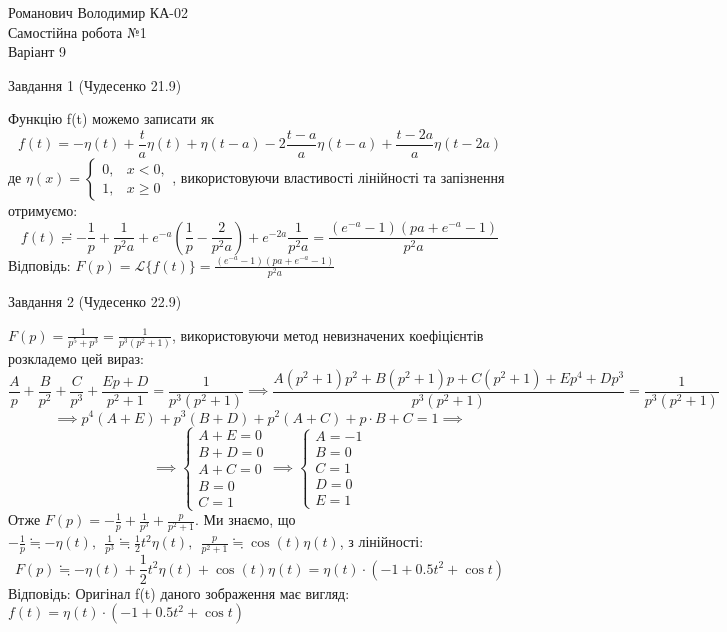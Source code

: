 \documentclass[12 pt]{article}
\begin{document}
\begin{center}
    \Large
    Романович Володимир КА-02 \\
    Самостійна робота №1 \\ 
    Варіант 9
\end{center}
\begin{center}
    \large 
    Завдання 1 (Чудесенко 21.9)
\end{center}
Функцію f(t) можемо записати як $$
f(t) = -\eta(t) + \frac{t}{a} \eta(t) +
\eta(t-a) - 2 \frac{t-a}{a} \eta(t-a) + \frac{t-2a}{a} \eta(t-2a)
$$
де $\eta(x) = 
\begin{cases}
    0, & x < 0,\\
    1, & x \geq 0
    \end{cases}$,
використовуючи властивості лінійності та запізнення отримуємо:\\ 
$$
f(t) \risingdotseq  -\frac{1}{p} + \frac{1}{p^2 a} +
 e^{-a}\left(\frac{1}{p} - \frac{2}{p^2 a}\right) + e^{-2a} \frac{1}{p^2 a} =
 \frac{(e^{-a} - 1)(pa+e^{-a}-1)}{p^2 a}
$$
Відповідь: $F(p) = \mathcal{L} \{ f(t) \} = \frac{(e^{-a} - 1)(pa+e^{-a}-1)}{p^2 a}$ 
\begin{center}
    \large 
    Завдання 2 (Чудесенко 22.9)
\end{center}
$F(p) = \frac{1}{p^5+p^3} = \frac{1}{p^3(p^2+1)}$, використовуючи метод
невизначених коефіцієнтів розкладемо цей вираз:
$$ 
\frac{A}{p} + \frac{B}{p^2} + \frac{C}{p^3} + \frac{Ep + D}{p^2+1} =
\frac{1}{p^3(p^2+1)}
\implies 
\frac{A(p^2+1)p^2 + B(p^2+1)p + C(p^2+1)+E p^4 + D p^3}{p^3(p^2+1)} 
= \frac{1}{p^3(p^2+1)}
$$ 
$$
\implies
p^4(A+E) + p^3(B+D) + p^2(A+C) + p\cdot B + C = 1
\implies
$$
$$ \implies
\begin{cases}
    A+E = 0 \\
    B+D = 0 \\ 
    A+C = 0 \\ 
    B = 0 \\ 
    C = 1
\end{cases}
\implies
\begin{cases}
    A = -1 \\ 
    B = 0 \\ 
    C = 1 \\
    D = 0 \\ 
    E = 1
\end{cases}
$$
Отже $F(p) = -\frac{1}{p} + \frac{1}{p^3} + \frac{p}{p^2 + 1}$. Ми знаємо, що
$-\frac{1}{p}\fallingdotseq - \eta(t), \ \ 
\frac{1}{p^3} \fallingdotseq \frac{1}{2}t^2 \eta(t), \ \ 
\frac{p}{p^2+1} \fallingdotseq \cos(t) \eta(t)$, з лінійності:
$$
F(p) \fallingdotseq - \eta(t) + \frac{1}{2}t^2 \eta(t) +\cos(t) \eta(t) = 
\eta(t) \cdot (-1 + 0.5 t^2 + \cos{t})
$$
Відповідь: Оригінал f(t) даного зображення має вигляд:
 $f(t) = \eta(t) \cdot (-1 + 0.5 t^2 + \cos{t})$
 
\end{document}
